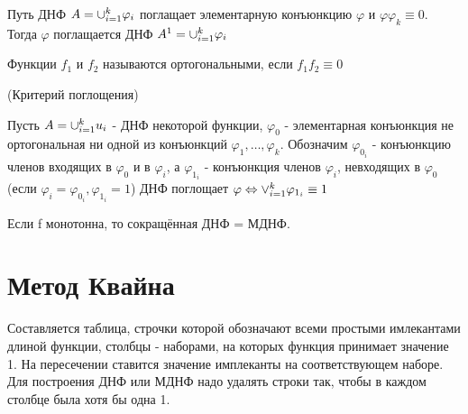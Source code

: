 \lemma Путь ДНФ $A = \Large\cup_{i=1}^k\varphi_i$ поглащает элементарную конъюнкцию $\varphi$ и $\varphi \varphi_k \equiv 0$. Тогда $\varphi$ поглащается ДНФ $A^1=\Large\cup_{i=1}^k\varphi_i$

\opr Функции $f_1$ и $f_2$ называются ортогональными, если $f_1f_2 \equiv 0$

\thr(Критерий поглощения)\par
Пусть  $A=\Large\cup_{i=1}^k\Large u_i$ - ДНФ некоторой функции, $\varphi_0$ - элементарная конъюнкция не ортогональная ни одной из конъюнкций $\varphi_1, \dotsc,\varphi_k$. Обозначим $\varphi_{0_i}$ - конъюнкцию членов входящих в $\varphi_0$  и в $\varphi_i$, а $\varphi_{1_i}$ - конъюнкция членов $\varphi_i$, невходящих в $\varphi_0$ (если $\varphi_i = \varphi_{0_i}, \varphi_{1_i} = 1$) ДНФ поглощает $\varphi \Leftrightarrow \Large\vee_{i=1}^k\varphi_{1_i} \equiv 1$

\utv Если f монотонна, то сокращённая ДНФ = МДНФ.

\section {Метод Квайна}
Составляется таблица, строчки которой обозначают всеми простыми имлекантами длиной функции, столбцы - наборами, на которых функция принимает значение 1. На пересечении ставится значение имплеканты на соответствующем наборе. Для построения ДНФ или МДНФ надо удалять строки так, чтобы в каждом столбце была хотя бы одна 1.
